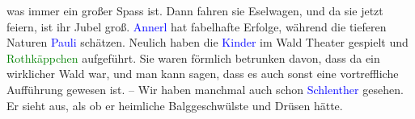                was immer ein großer Spass ist. Dann fahren sie Eselwagen, und da sie jetzt \label{K_L03510-4v}\label{K_L03510-4h} feiern, ist ihr Jubel groß. \textcolor{blue}{Annerl}{}\ledrightnote{\textcolor{blue}{Anna Katharina Rehmann}} hat fabelhafte Erfolge, während die tieferen Naturen
                  \textcolor{blue}{Pauli}{}\ledrightnote{\textcolor{blue}{Paul Salten}} schätzen. Neulich haben die \textcolor{blue}{Kinder}{}\ledrightnote{{$\rightarrow$}\textcolor{blue}{Paul Salten}{\newline}{$\rightarrow$}\textcolor{blue}{Anna Katharina Rehmann}} im Wald
               Theater gespielt und \textcolor{green}{Rothkäppchen}{}\ledrightnote{\textcolor{green}{Rotkäppchen}} aufgeführt.
               Sie waren förmlich betrunken davon, dass da ein wirklicher Wald war, und man kann
               sagen, dass es auch sonst eine vortreffliche Aufführung gewesen ist. – Wir haben
               manchmal auch schon \textcolor{blue}{Schlenther}{}\ledrightnote{\textcolor{blue}{Paul Schlenther}} gesehen. Er
               sieht aus, als ob er heimliche Balggeschwülste und Drüsen hätte.\pend
           
